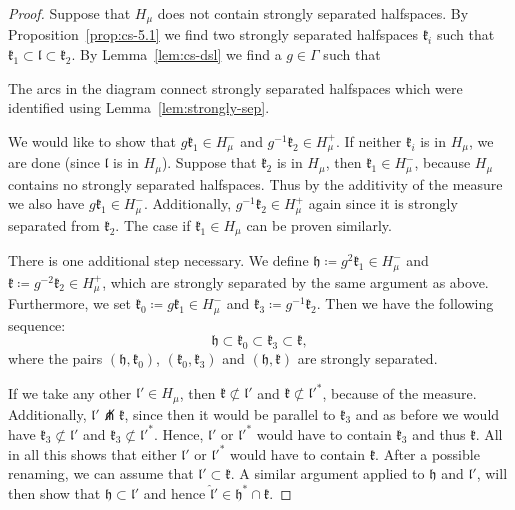 \begin{proof}
  Suppose that \(H_\mu\) does not contain strongly separated halfspaces. By Proposition\ \ref{prop:cs-5.1} we find two strongly separated halfspaces \(\mathfrak{k}_i\) such that \(\mathfrak{k}_1 \subset \mathfrak{l} \subset \mathfrak{k}_2\). By Lemma~\ref{lem:cs-dsl} we find a \(g \in \Gamma\) such that
  \begin{center}
    
  \end{center}
  The arcs in the diagram connect strongly separated halfspaces which were identified using Lemma~\ref{lem:strongly-sep}.

  We would like to show that \(g\mathfrak{k}_1 \in H_\mu^-\) and \(g^{-1}\mathfrak{k}_2 \in H_\mu^+\). If neither \(\mathfrak{k}_i\) is in \(H_\mu\), we are done (since \(\mathfrak{l}\) is in \(H_\mu\)). Suppose that \(\mathfrak{k}_2\) is in \(H_\mu\), then \(\mathfrak{k}_1 \in H_\mu^-\), because \(H_\mu\) contains no strongly separated halfspaces. Thus by the additivity of the measure we also have \(g\mathfrak{k}_1 \in H_\mu^-\). Additionally, \(g^{-1}\mathfrak{k}_2 \in H_\mu^+\) again since it is strongly separated from \(\mathfrak{k}_2\). The case if \(\mathfrak{k}_1 \in H_\mu\) can be proven similarly.

  There is one additional step necessary. We define \(\mathfrak{h} \coloneqq g^2\mathfrak{k}_1 \in H_\mu^-\) and \(\mathfrak{k} \coloneqq g^{-2}\mathfrak{k}_2 \in H_\mu^+\), which are strongly separated by the same argument as above. Furthermore, we set \(\mathfrak{k_0} \coloneqq g\mathfrak{k}_1 \in H_\mu^-\) and \(\mathfrak{k}_3 \coloneqq g^{-1}\mathfrak{k}_2\). Then we have the following sequence:
  \[
    \mathfrak{h} \subset \mathfrak{k}_0 \subset \mathfrak{k}_3 \subset \mathfrak{k},
  \]
  where the pairs \((\mathfrak{h}, \mathfrak{k}_0)\), \((\mathfrak{k_0}, \mathfrak{k}_3)\) and \((\mathfrak{h}, \mathfrak{k})\) are strongly separated. 

  If we take any other \(\mathfrak{l}' \in H_\mu\), then \(\mathfrak{k} \not\subset \mathfrak{l}'\) and \(\mathfrak{k} \not \subset \mathfrak{l}'^\ast\), because of the measure. Additionally, \(\mathfrak{l}' \not\pitchfork \mathfrak{k}\), since then it would be parallel to \(\mathfrak{k}_3\) and as before we would have \(\mathfrak{k}_3 \not\subset \mathfrak{l}'\) and \(\mathfrak{k}_3 \not\subset \mathfrak{l}'^\ast\). Hence, \(\mathfrak{l}'\) or \(\mathfrak{l}'^\ast\) would have to contain \(\mathfrak{k}_3\) and thus \(\mathfrak{k}\). All in all this shows that either \(\mathfrak{l}'\) or \(\mathfrak{l}'^\ast\) would have to contain \(\mathfrak{k}\). After a possible renaming, we can assume that \(\mathfrak{l}' \subset \mathfrak{k}\). A similar argument applied to \(\mathfrak{h}\) and \(\mathfrak{l}'\), will then show that \(\mathfrak{h} \subset \mathfrak{l}'\) and hence \(\mathfrak{\hat l}' \in \mathfrak{h}^\ast \cap \mathfrak{k}\).
\end{proof}


